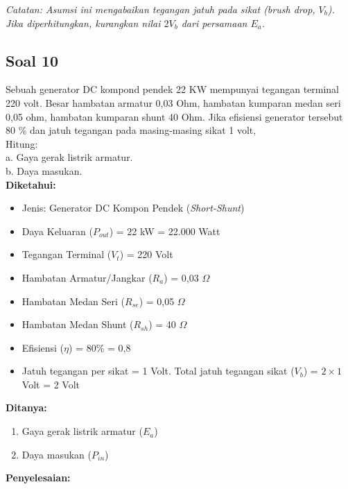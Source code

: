 \documentclass[12pt, a4paper]{article}
\begin{document}
\textit{Catatan: Asumsi ini mengabaikan tegangan jatuh pada sikat (brush drop, $V_b$). Jika diperhitungkan, kurangkan nilai $2V_b$ dari persamaan $E_a$.}

\subsection*{Soal 10}
Sebuah generator DC kompond pendek 22 KW mempunyai tegangan terminal 220 volt. Besar hambatan armatur 0,03 Ohm, hambatan kumparan medan seri 0,05 ohm, hambatan kumparan shunt 40 Ohm. Jika efisiensi generator tersebut 80 \% dan jatuh tegangan pada masing-masing sikat 1 volt,\\
Hitung:\\
a. Gaya gerak listrik armatur.\\
b. Daya masukan.\\

\textbf{Diketahui:}
\begin{itemize}
    \item Jenis: Generator DC Kompon Pendek (\textit{Short-Shunt})
    \item Daya Keluaran ($P_{out}$) = 22 kW = 22.000 Watt
    \item Tegangan Terminal ($V_t$) = 220 Volt
    \item Hambatan Armatur/Jangkar ($R_a$) = 0,03 $\Omega$
    \item Hambatan Medan Seri ($R_{se}$) = 0,05 $\Omega$
    \item Hambatan Medan Shunt ($R_{sh}$) = 40 $\Omega$
    \item Efisiensi ($\eta$) = 80\% = 0,8
    \item Jatuh tegangan per sikat = 1 Volt. Total jatuh tegangan sikat ($V_b$) = $2 \times 1$ Volt = 2 Volt
\end{itemize}

\textbf{Ditanya:}
\begin{enumerate}[label=\alph*.]
    \item Gaya gerak listrik armatur ($E_a$)
    \item Daya masukan ($P_{in}$)
\end{enumerate}

\textbf{Penyelesaian:}
\end{document}
